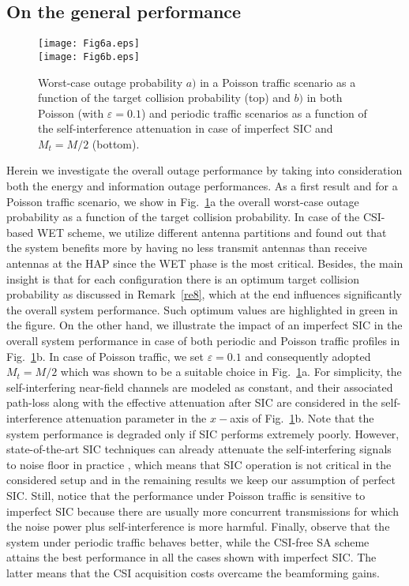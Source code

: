 \documentclass[10pt,journal,a4paper]{IEEEtran}
\begin{document}
	\subsection{On the general performance}\label{generalP}
    \begin{figure}[t!]
    	\centering
    	\texttt{[image: Fig6a.eps]}\vspace{3mm}\\
    	\texttt{[image: Fig6b.eps]}
    	\caption{Worst-case outage probability  $a)$ in a Poisson traffic scenario as a function of the target collision  probability (top) and $b)$ in both Poisson (with $\varepsilon=0.1$) and periodic traffic scenarios as a function of the self-interference attenuation in case of imperfect SIC and $M_t=M/2$ (bottom).}
    	\label{Fig6}
    \end{figure}
%
	Herein we investigate the overall outage performance by taking into consideration both the energy and information outage performances. As a first result and for a Poisson traffic scenario, we show in Fig.~\ref{Fig6}a the overall worst-case outage probability   as a function of the target collision  probability. In case of the CSI-based WET scheme, we utilize different antenna partitions and found out that the system benefits more by having no less transmit antennas than receive antennas at the HAP since the WET phase is the most critical. Besides, the main insight is that for each configuration there is an optimum target {collision  probability} as discussed in Remark~\ref{re8}, which at the end influences significantly the overall system performance. Such optimum values are highlighted in green in the figure. On the other hand,  we illustrate the impact of an imperfect SIC in the overall system performance in case of both periodic and Poisson traffic profiles in Fig.~\ref{Fig6}b. In case of Poisson traffic, we set $\varepsilon=0.1$ and consequently adopted $M_t=M/2$ which was shown to be a suitable choice in Fig.~\ref{Fig6}a. For simplicity, the self-interfering near-field channels are modeled as constant, and their associated path-loss along with the effective attenuation after SIC are considered in the self-interference attenuation parameter in the $x-$axis of Fig.~\ref{Fig6}b. Note that the system performance is degraded only if SIC performs extremely poorly. However, state-of-the-art SIC techniques can already attenuate the self-interfering signals to noise floor in practice \cite{Alves.2020}, which means that SIC operation is not critical in the considered setup and in the remaining results we keep our assumption of perfect SIC. Still, notice that the performance under Poisson traffic is sensitive to imperfect SIC because there are usually more concurrent transmissions for which the noise power plus self-interference is more harmful. Finally, observe that the system under periodic traffic behaves better, while the CSI-free SA scheme attains the best performance in all the cases shown with imperfect SIC. The latter means that the CSI acquisition costs overcame the beamforming gains.
	
\end{document}
